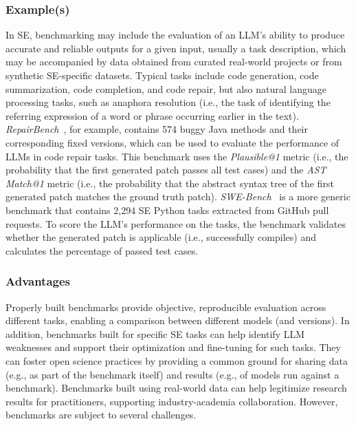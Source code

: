 \subsubsection{Example(s)}

In SE, benchmarking may include the evaluation of an LLM's ability to produce accurate and reliable outputs for a given input, usually a task description, which may be accompanied by data obtained from curated real-world projects or from synthetic SE-specific datasets.
Typical tasks include code generation, code summarization, code completion, and code repair, but also natural language processing tasks, such as anaphora resolution (i.e., the task of identifying the referring expression of a word or phrase occurring earlier in the text). %
\emph{RepairBench}~\cite{silva2024repairbench}, for example, contains 574 buggy Java methods and their corresponding fixed versions, which can be used to evaluate the performance of LLMs in code repair tasks.
This benchmark uses the \emph{Plausible@1} metric (i.e., the probability that the first generated patch passes all test cases) and the \emph{AST Match@1} metric (i.e., the probability that the abstract syntax tree of the first generated patch matches the ground truth patch).
\emph{SWE-Bench}~\cite{DBLP:conf/iclr/JimenezYWYPPN24} is a more generic benchmark that contains 2,294 SE Python tasks extracted from GitHub pull requests.
To score the LLM's performance on the tasks, the benchmark validates whether the generated patch is applicable (i.e., successfully compiles) and calculates the percentage of passed test cases.

\subsubsection{Advantages}

Properly built benchmarks provide objective, reproducible evaluation across different tasks, enabling a comparison between different models (and versions).
In addition, benchmarks built for specific SE tasks can help identify LLM weaknesses and support their optimization and fine-tuning for such tasks.
They can foster open science practices by providing a common ground for sharing data (e.g., as part of the benchmark itself) and results (e.g., of models run against a benchmark).
Benchmarks built using real-world data can help legitimize research results for practitioners, supporting industry-academia collaboration.
However, benchmarks are subject to several challenges.

